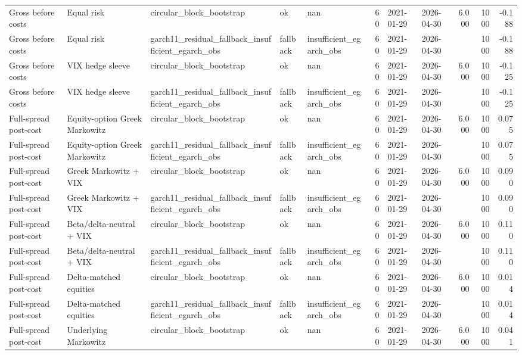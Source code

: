 \begin{tabular}{lllllrllrrr}
Gross before costs & Equal risk & circular\_block\_bootstrap & ok & nan & 60 & 2021-01-29 & 2026-04-30 & 6.000 & 1000 & -0.188 \\
Gross before costs & Equal risk & garch11\_residual\_fallback\_insufficient\_egarch\_obs & fallback & insufficient\_egarch\_obs & 60 & 2021-01-29 & 2026-04-30 &  & 1000 & -0.188 \\
Gross before costs & VIX hedge sleeve & circular\_block\_bootstrap & ok & nan & 60 & 2021-01-29 & 2026-04-30 & 6.000 & 1000 & -0.125 \\
Gross before costs & VIX hedge sleeve & garch11\_residual\_fallback\_insufficient\_egarch\_obs & fallback & insufficient\_egarch\_obs & 60 & 2021-01-29 & 2026-04-30 &  & 1000 & -0.125 \\
Full-spread post-cost & Equity-option Greek Markowitz & circular\_block\_bootstrap & ok & nan & 60 & 2021-01-29 & 2026-04-30 & 6.000 & 1000 & 0.075 \\
Full-spread post-cost & Equity-option Greek Markowitz & garch11\_residual\_fallback\_insufficient\_egarch\_obs & fallback & insufficient\_egarch\_obs & 60 & 2021-01-29 & 2026-04-30 &  & 1000 & 0.075 \\
Full-spread post-cost & Greek Markowitz + VIX & circular\_block\_bootstrap & ok & nan & 60 & 2021-01-29 & 2026-04-30 & 6.000 & 1000 & 0.090 \\
Full-spread post-cost & Greek Markowitz + VIX & garch11\_residual\_fallback\_insufficient\_egarch\_obs & fallback & insufficient\_egarch\_obs & 60 & 2021-01-29 & 2026-04-30 &  & 1000 & 0.090 \\
Full-spread post-cost & Beta/delta-neutral + VIX & circular\_block\_bootstrap & ok & nan & 60 & 2021-01-29 & 2026-04-30 & 6.000 & 1000 & 0.110 \\
Full-spread post-cost & Beta/delta-neutral + VIX & garch11\_residual\_fallback\_insufficient\_egarch\_obs & fallback & insufficient\_egarch\_obs & 60 & 2021-01-29 & 2026-04-30 &  & 1000 & 0.110 \\
Full-spread post-cost & Delta-matched equities & circular\_block\_bootstrap & ok & nan & 60 & 2021-01-29 & 2026-04-30 & 6.000 & 1000 & 0.014 \\
Full-spread post-cost & Delta-matched equities & garch11\_residual\_fallback\_insufficient\_egarch\_obs & fallback & insufficient\_egarch\_obs & 60 & 2021-01-29 & 2026-04-30 &  & 1000 & 0.014 \\
Full-spread post-cost & Underlying Markowitz & circular\_block\_bootstrap & ok & nan & 60 & 2021-01-29 & 2026-04-30 & 6.000 & 1000 & 0.041 \\

\end{tabular}
